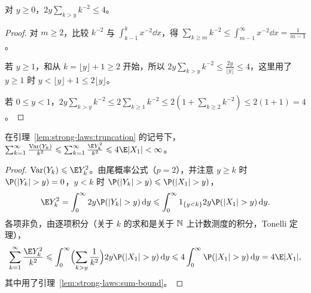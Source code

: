 \begin{lemma}\label{lem:strong-laws:sum-bound}
对 $y\geqslant0$，$2y\sum_{k>y}k^{-2}\leqslant4$。
\end{lemma}
\begin{proof}
对 $m\geqslant2$，比较 $k^{-2}$ 与 $\int_{k-1}^kx^{-2}\dd x$，得 $\sum_{k\geqslant m}k^{-2}\leqslant\int_{m-1}^\infty x^{-2}\dd x=\frac1{m-1}$。

若 $y\geqslant1$，和从 $k=\lfloor y\rfloor+1\geqslant2$ 开始，所以 $2y\sum_{k>y}k^{-2}\leqslant\frac{2y}{\lfloor y\rfloor}\leqslant4$，这里用了 $y\geqslant1$ 时 $y<\lfloor y\rfloor+1\leqslant2\lfloor y\rfloor$。

若 $0\leqslant y<1$，$2y\sum_{k>y}k^{-2}\leqslant2\sum_{k\geqslant1}k^{-2}\leqslant2(1+\sum_{k\geqslant2}k^{-2})\leqslant2(1+1)=4$。
\end{proof}

\begin{lemma}\label{lem:strong-laws:variance}
在引理~\ref{lem:strong-laws:truncation} 的记号下，$\sum_{k=1}^\infty\frac{\Var(Y_k)}{k^2}\leqslant\sum_{k=1}^\infty\frac{\E Y_k^2}{k^2}\leqslant4\E\abs{X_1}<\infty$。
\end{lemma}
\begin{proof}
$\Var(Y_k)\leqslant \E Y_k^2$。由尾概率公式（$p=2$），并注意 $y\geqslant k$ 时 $\P(\abs{Y_k}>y)=0$，$y<k$ 时 $\P(\abs{Y_k}>y)\leqslant \P(\abs{X_1}>y)$，
\[
\E Y_k^2=\int_0^\infty2y\P(\abs{Y_k}>y)\dd y\leqslant\int_0^\infty\one_{\{y<k\}}2y\P(\abs{X_1}>y)\dd y .
\]
各项非负，由逐项积分（关于 $k$ 的求和是关于 $\mathbb{N}$ 上计数测度的积分，Tonelli 定理），
\[
\sum_{k=1}^\infty\frac{\E Y_k^2}{k^2}\leqslant\int_0^\infty\Bigl(\sum_{k>y}\frac1{k^2}\Bigr)2y\P(\abs{X_1}>y)\dd y\leqslant4\int_0^\infty \P(\abs{X_1}>y)\dd y=4\E\abs{X_1},
\]
其中用了引理~\ref{lem:strong-laws:sum-bound}。
\end{proof}


